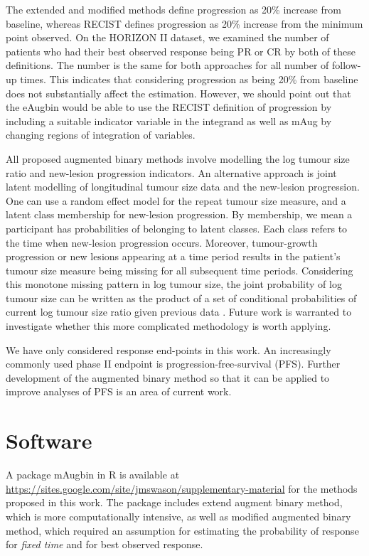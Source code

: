 \documentclass[10pt,A4]{article}
\begin{document}
The extended and modified methods define progression as 20\% increase from baseline, whereas RECIST defines progression as 20\% increase from the minimum point observed. On the HORIZON II dataset, we examined the number of patients who had their best observed response being PR or CR by both of these definitions.  The number is the same for both approaches for all number of follow-up times. This indicates that considering progression as being 20\% from baseline does not substantially affect the estimation. However, we should point out that the eAugbin would be able to use the RECIST definition of progression by including a suitable indicator variable in the integrand as well as mAug by changing regions of integration of variables.

All proposed augmented binary methods involve modelling the log tumour size ratio and new-lesion progression indicators. An alternative approach is joint latent modelling of longitudinal tumour size data and the new-lesion progression. One can use a random effect model for the repeat tumour size measure, and a latent class membership for new-lesion progression. By membership, we mean a participant has probabilities of belonging to latent classes. Each class refers to the time when new-lesion progression occurs. Moreover, tumour-growth progression or new lesions appearing at a time period results in the patient’s tumour size measure being missing for all subsequent time periods. Considering this monotone missing pattern in log tumour size, the joint probability of log tumour size can be written as the product of a set of conditional probabilities of current log tumour size ratio given previous data \cite{Schafer1997}. Future work is warranted to investigate whether this more complicated methodology is worth applying.

We have only considered response end-points in this work. An increasingly commonly used phase II endpoint is progression-free-survival (PFS). Further development of the augmented binary method so that it can be applied to improve analyses of PFS is an area of current work.

\section{Software}
\label{sec5}
A package mAugbin in R is available at \href{https://sites.google.com/site/jmswason/supplementary-material}{https://sites.google.com/site/jmswason/supplementary-material} for the methods proposed in this work. The package includes extend augment binary method, which is more computationally intensive, as well as modified augmented binary method, which required an assumption for estimating the probability of response for \textit{fixed time} and for best observed response. 
\end{document}

